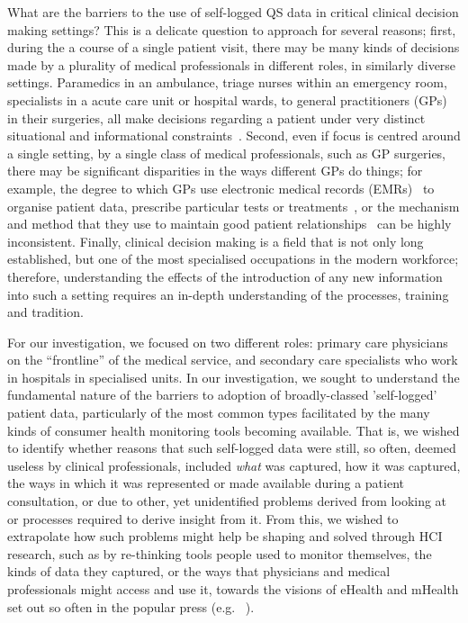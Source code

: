 \documentclass{sigchi}
\begin{document}
What are the barriers to the use of self-logged QS data in critical clinical decision making settings?  This is a delicate question to approach for several reasons; first, during the a course of a single patient visit, there may be many kinds of decisions made by a plurality of medical professionals in different roles, in similarly diverse settings.   Paramedics in an ambulance, triage nurses within an emergency room, specialists in a acute care unit or hospital wards, to general practitioners (GPs) in their surgeries, all make decisions regarding a patient under very distinct situational and informational constraints~\cite{croskerry}. Second, even if focus is centred around a single setting, by a single class of medical professionals, such as GP surgeries, there may be significant disparities in the ways different GPs do things; for example, the degree to which GPs use electronic medical records (EMRs)~\cite{hunt} to organise patient data, prescribe particular tests or treatments~\cite{}, or the mechanism and method that they use to maintain good patient relationships~\cite{} can be highly inconsistent. Finally, clinical decision making is a field that is not only long established, but one of the most specialised occupations in the modern workforce; therefore, understanding the effects of the introduction of any new information into such a setting requires an in-depth understanding of the processes, training and tradition.

For our investigation, we focused on two different roles: primary care physicians on the ``frontline'' of the medical service, and secondary care specialists who work in hospitals in specialised units.  In our investigation, we sought to understand the fundamental nature of the barriers to adoption of broadly-classed 'self-logged' patient data, particularly of the most common types facilitated by the many kinds of consumer health monitoring tools becoming available.  That is, we wished to identify whether reasons that such self-logged data were still, so often, deemed useless by clinical professionals, included \emph{what} was captured, how it was captured, the ways in which it was represented or made available during a patient consultation, or  due to other, yet unidentified problems derived from looking at or processes required to derive insight from it.  From this, we wished to extrapolate how such problems might help be shaping and solved through HCI research, such as by re-thinking tools people used to monitor themselves, the kinds of data they captured, or the ways that physicians and medical professionals might access and use it, towards the visions of eHealth and mHealth set out so often in the popular press (e.g. ~\cite{goetz, thingy, thingy}).
\end{document}
